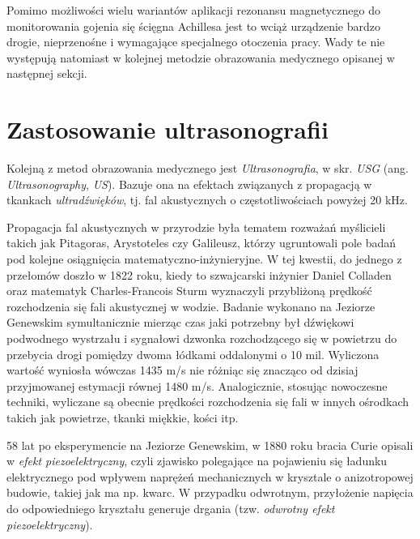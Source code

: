 Pomimo możliwości wielu wariantów aplikacji rezonansu magnetycznego do monitorowania gojenia się ścięgna Achillesa jest to wciąż urządzenie bardzo drogie, nieprzenośne i wymagające specjalnego otoczenia pracy. Wady te nie występują natomiast w kolejnej metodzie obrazowania medycznego opisanej w następnej sekcji. 

\section{Zastosowanie ultrasonografii}

Kolejną z metod obrazowania medycznego jest \textit{Ultrasonografia}, w skr. \textit{USG} (ang. \textit{Ultrasonography}, \textit{US}). Bazuje ona na efektach związanych z propagacją w tkankach \textit{ultradźwięków}, tj. fal akustycznych o częstotliwościach powyżej 20 kHz.

Propagacja fal akustycznych w przyrodzie była tematem rozważań myślicieli takich jak Pitagoras, Arystoteles czy Galileusz, którzy ugruntowali pole badań pod kolejne osiągnięcia matematyczno-inżynieryjne. W tej kwestii, do jednego z przełomów doszło w 1822 roku, kiedy to szwajcarski inżynier Daniel Colladen oraz matematyk Charles-Francois Sturm wyznaczyli przybliżoną prędkość rozchodzenia się fali akustycznej w wodzie. Badanie wykonano na Jeziorze Genewskim symultanicznie mierząc czas jaki potrzebny był dźwiękowi podwodnego wystrzału i sygnałowi dzwonka rozchodzącego się w powietrzu do przebycia drogi pomiędzy dwoma łódkami oddalonymi o 10 mil. Wyliczona wartość wyniosła wówczas 1435 m/s nie różniąc się znacząco od dzisiaj przyjmowanej estymacji równej 1480 m/s. Analogicznie, stosując nowoczesne techniki, wyliczane są obecnie prędkości rozchodzenia się fali w innych ośrodkach takich jak powietrze, tkanki miękkie, kości itp.

58 lat po eksperymencie na Jeziorze Genewskim, w 1880 roku bracia Curie opisali w \cite{Curie1880} \textit{efekt piezoelektryczny}, czyli zjawisko polegające na pojawieniu się ładunku elektrycznego pod wpływem naprężeń mechanicznych w krysztale o anizotropowej budowie, takiej jak ma np. kwarc. W przypadku odwrotnym, przyłożenie napięcia do odpowiedniego kryształu generuje drgania (tzw. \textit{odwrotny efekt piezoelektryczny}). 

